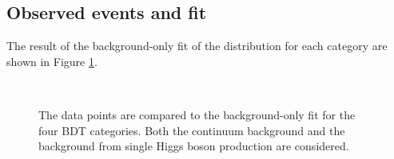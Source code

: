 \subsection{Observed events and \myy fit}
\label{HHyybb:Results:Fit}
The result of the background-only fit of the \myy distribution for each category are shown in Figure \ref{fig:HHyybb:Results:Fit:myy}. 
\begin{figure}[htbp]
    \centering
     \\
    \caption{The data points are compared to the background-only fit for the four BDT categories. Both the continuum background and the background from single Higgs boson production are considered.}
    \label{fig:HHyybb:Results:Fit:myy}
\end{figure}
